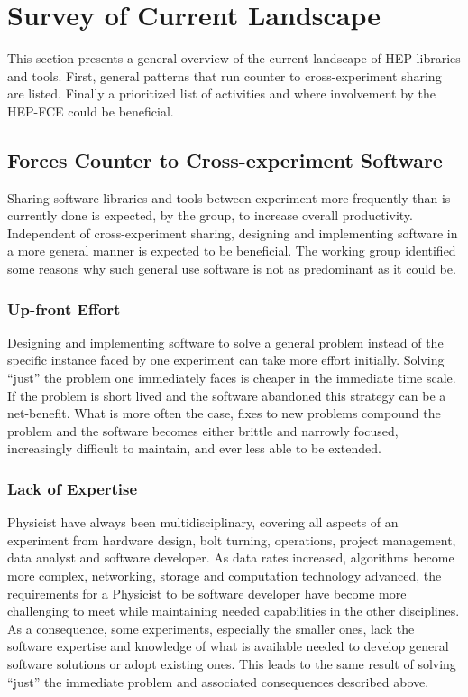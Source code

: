 \section{Survey of Current Landscape}


This section presents a general overview of the current landscape of
HEP libraries and tools.  
%
First, general patterns that run counter to cross-experiment sharing
are listed.
%
%
Finally a prioritized list of activities and where involvement by the
HEP-FCE could be beneficial.

\subsection{Forces Counter to Cross-experiment Software}

Sharing software libraries and tools between experiment more
frequently than is currently done is expected, by the group, to
increase overall productivity.  Independent of cross-experiment
sharing, designing and implementing software in a more general manner
is expected to be beneficial.  The working group
identified some reasons why such general use software is not as
predominant as it could be.

\subsubsection{Up-front Effort}

Designing and implementing software to solve a general problem instead
of the specific instance faced by one experiment can take more effort
initially.  Solving ``just'' the problem one immediately faces is
cheaper in the immediate time scale.  If the problem is short lived
and the software abandoned this strategy can be a net-benefit.  What
is more often the case, fixes to new problems compound the problem and
the software becomes either brittle and narrowly focused, increasingly
difficult to maintain, and ever less able to be extended.

\subsubsection{Lack of Expertise}

Physicist have always been multidisciplinary, covering all aspects of
an experiment from hardware design, bolt turning, operations, project
management, data analyst and software developer.  As data rates
increased, algorithms become more complex, networking, storage and
computation technology advanced, the requirements for a Physicist to
be software developer have become more challenging to meet while
maintaining needed capabilities in the other
disciplines.  As a consequence, some experiments, especially the smaller
ones, lack the software expertise and knowledge of what is available
needed to develop general software solutions or adopt existing ones.
This leads to the same result of solving ``just'' the immediate
problem and associated consequences described above.

